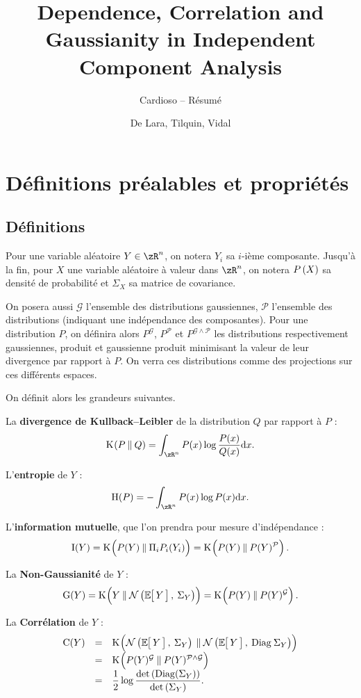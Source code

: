 \documentclass[a4paper]{article}
\title{Dependence, Correlation and Gaussianity in Independent Component Analysis}
\subtitle{Cardioso -- Résumé}
\author{De Lara, Tilquin, Vidal}
\date{}
\newcommand{\Kl}[3][]{\mathrm K_{#1}\!\zp{#2\:\|\:#3}}
\newcommand{\zZ}[2]{\mathrm #1\!\zp{#2}}
\newcommand{\zD}{\mathcal}
\newcommand{\Ng}[2]{\mathcal{N}\zp{#1,\:#2}}
\begin{document}
 

\zztitre

\section{Définitions préalables et propriétés}

\subsection{Définitions}
Pour une variable aléatoire $Y\in\zR^n$, on notera $Y_i$ sa $i$-ième composante.
Jusqu'à la fin, pour $X$ une variable aléatoire à valeur dans $\zR^n$, on notera $P\zp{X}$ sa densité de probabilité et $\Sigma_X$ sa matrice de covariance.
\znl

On posera aussi $\zD G$ l'ensemble des distributions gaussiennes, $\zD P$ l'ensemble des distributions  (indiquant une indépendance des composantes). Pour une distribution $P$, on définira alors $P^{\zD G}$, $P^{\zD P}$ et $P^{\zD G \wedge \zD P}$ les distributions respectivement gaussiennes, produit et gaussienne produit minimisant la valeur de leur divergence par rapport à $P$. On verra ces distributions comme des projections sur ces différents espaces.\znl

On définit alors les grandeurs suivantes.\znl


La \textbf{divergence de Kullback--Leibler} de la distribution $Q$ par rapport à $P$ :
\begin{equation}
  \Kl PQ = \int_{\zR^n} P(x) \log\frac{P(x)}{Q(x)} \zdx x.
\end{equation}

L'\textbf{entropie} de $Y$ :\begin{equation}
  \zZ HP = - \int_{\zR^n} P(x)\log P(x) \zdx x.
\end{equation}

L'\textbf{information mutuelle}, que l'on prendra pour mesure d'indépendance :
\begin{equation}
  \zZ IY = \Kl {\zpbig2 P(Y)}{\Pi_i P_i(Y_i)} = \Kl {\zpbig2 P(Y)}{P(Y)^{\zD P}}.
\end{equation}

La \textbf{Non-Gaussianité} de $Y$ :
\begin{equation}
  \zZ GY = \Kl{Y}{\Ng{\zesp Y}{\Sigma_Y}\zpbig2} = \Kl {\zpbig2 P(Y)}{P(Y)^{\zD G}}.
\end{equation}

La \textbf{Corrélation} de $Y$ :
\begin{equation}\begin{array}{rcl}
  \zZ CY &=& \displaystyle\Kl{\Ng{\zesp Y}{\Sigma_Y}\zpbig2}{\Ng{\zesp Y}{\mathrm{Diag}\:\Sigma_Y}}\\
  &=&\Kl{\zpbig2 P(Y)^{\zD G}}{P(Y)^{\zD P\wedge\zD G}}\\
  &=& \displaystyle\frac 12\log\frac{\det\zp{\mathrm{Diag}(\Sigma_Y)}}{\det\zp{\Sigma_Y}}.
\end{array}\end{equation}
\end{document}
